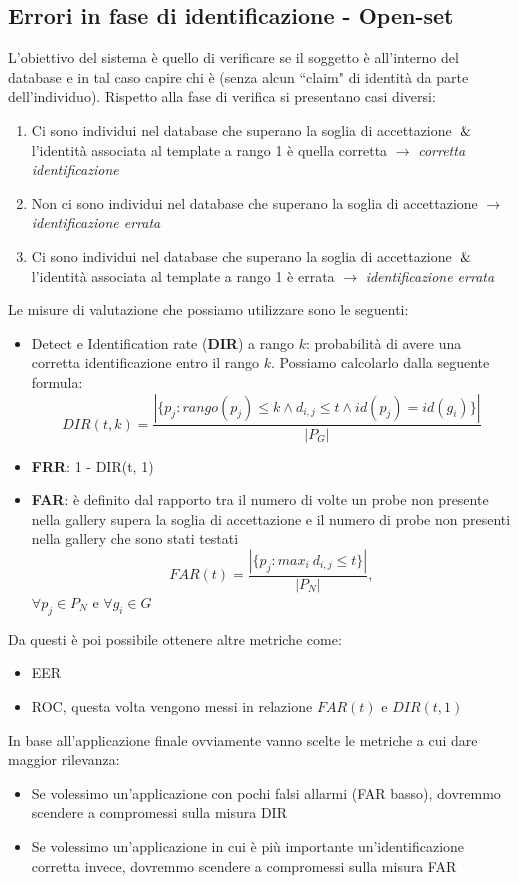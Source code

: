 \documentclass{article}
\begin{document}
\subsection{Errori in fase di identificazione - Open-set}
L'obiettivo del sistema è quello di verificare se il soggetto è all'interno del database e in tal caso capire chi è (senza alcun ``claim" di identità da parte dell'individuo). Rispetto alla fase di verifica si presentano casi diversi:
\begin{enumerate}
    \item Ci sono individui nel database che superano la soglia di accettazione $\And$ l'identità associata al template a rango 1 è quella corretta $\rightarrow$ \textit{corretta identificazione}
    \item Non ci sono individui nel database che superano la soglia di accettazione $\rightarrow$ \textit{identificazione errata}
    \item Ci sono individui nel database che superano la soglia di accettazione $\And$ l'identità associata al template a rango 1 è errata $\rightarrow$ \textit{identificazione errata}
\end{enumerate}

Le misure di valutazione che possiamo utilizzare sono le seguenti:
\begin{itemize}
    \item Detect e Identification rate (\textbf{DIR}) a rango $k$: probabilità di avere una corretta identificazione entro il rango $k$. Possiamo calcolarlo dalla seguente formula:
    $$DIR(t,k) = \frac{| \{ p_j : rango(p_j) \leq k \land d_{i,j} \leq t \land id(p_j) = id(g_i) \}|}{|P_G|}$$
    \item \textbf{FRR}: 1 - DIR(t, 1)
    \item \textbf{FAR}: è definito dal rapporto tra il numero di volte un probe non presente nella gallery supera la soglia di accettazione e il numero di probe non presenti nella gallery che sono stati testati
    $$FAR(t) = \frac{|\{p_j : max_i\ d_{i,j} \leq t \}|}{|P_N|},$$ $\forall p_j \in P_N$ e $\forall g_i \in G$
\end{itemize}
Da questi è poi possibile ottenere altre metriche come:
\begin{itemize}
    \item EER
    \item ROC, questa volta vengono messi in relazione $FAR(t)$ e $DIR(t, 1)$
\end{itemize}

In base all'applicazione finale ovviamente vanno scelte le metriche a cui dare maggior rilevanza:
\begin{itemize}
    \item Se volessimo un'applicazione con pochi falsi allarmi (FAR basso), dovremmo scendere a compromessi sulla misura DIR
    \item Se volessimo un'applicazione in cui è più importante un'identificazione corretta invece, dovremmo scendere a compromessi sulla misura FAR
\end{itemize}
\end{document}
